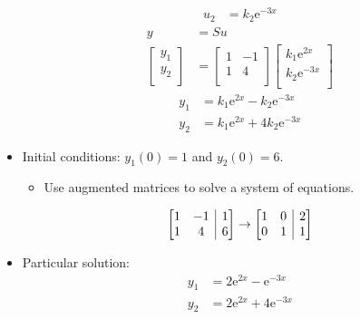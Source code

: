 \documentclass{article}
\makeatletter
\newcommand{\e}{\text{e}}
\newenvironment{amatrix}[1]{
    \left[\begin{array}{@{}*{#1}{c}|c@{}}
}{
    \end{array}\right]
}
\makeatother
\begin{document}
\begin{itemize}
\begin{align*}
        u_2 &= k_2\e^{-3x}
    \end{align*}
    \begin{align*}
        y &= Su\\
        \begin{bmatrix}
            y_1\\
            y_2\\
        \end{bmatrix}
        &=
        \begin{bmatrix}
            1 & -1\\
            1 & 4\\
        \end{bmatrix}
        \begin{bmatrix}
            k_1\e^{2x}\\
            k_2\e^{-3x}\\
        \end{bmatrix}
    \end{align*}
    \begin{align*}
        y_1 &= k_1\e^{2x}-k_2\e^{-3x}\\
        y_2 &= k_1\e^{2x}+4k_2\e^{-3x}
    \end{align*}
    \item {}Initial conditions: $y_1(0)=1$ and $y_2(0)=6$.
    \begin{itemize}
        \item Use augmented matrices to solve a system of equations.
    \end{itemize}
    \begin{equation*}
        \begin{amatrix}{2}
            1 & -1 & 1\\
            1 & 4 & 6\\
        \end{amatrix}
        \rightarrow
        \begin{amatrix}{2}
            1 & 0 & 2\\
            0 & 1 & 1\\
        \end{amatrix}
    \end{equation*}
    \item Particular solution:
    \begin{align*}
        y_1 &= 2\e^{2x}-\e^{-3x}\\
        y_2 &= 2\e^{2x}+4\e^{-3x}
    \end{align*}
\end{itemize}
\end{document}
